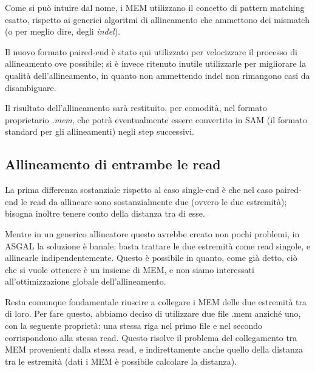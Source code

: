 Come si può intuire dal nome, i MEM utilizzano il concetto di pattern matching esatto, rispetto  ai generici algoritmi di allineamento che ammettono dei mismatch (o per meglio dire, degli \textit{indel}). 

Il nuovo formato paired-end è stato qui utilizzato per velocizzare il processo di allineamento ove possibile; si è invece ritenuto inutile utilizzarle per migliorare la qualità dell'allineamento, in quanto non ammettendo indel non rimangono casi da disambiguare.

Il risultato dell'allineamento sarà restituito, per comodità, nel formato proprietario \textit{.mem}, che potrà eventualmente essere convertito in SAM (il formato standard per gli allineamenti) negli step successivi.

\newpage

\subsection{Allineamento di entrambe le read}
La prima differenza sostanziale rispetto al caso single-end è che nel caso paired-end le read da allineare sono sostanzialmente due (ovvero le due estremità); bisogna inoltre tenere conto della distanza tra di esse. 

Mentre in un generico allineatore questo avrebbe creato non pochi problemi, in ASGAL la soluzione è banale: basta trattare le due estremità come read singole, e allinearle indipendentemente. Questo è possibile in quanto, come già detto, ciò che si vuole ottenere è un insieme di MEM, e non siamo interessati all'ottimizzazione globale dell'allineamento. %

Resta comunque fondamentale riuscire a collegare i MEM delle due estremità tra di loro. Per fare questo, abbiamo deciso di utilizzare due file .mem anziché uno, con la seguente proprietà: una stessa riga nel primo file e nel secondo corrispondono alla stessa read. Questo risolve il problema del collegamento tra MEM provenienti dalla stessa read, e indirettamente anche quello della distanza tra le estremità (dati i MEM è possibile calcolare la distanza).

